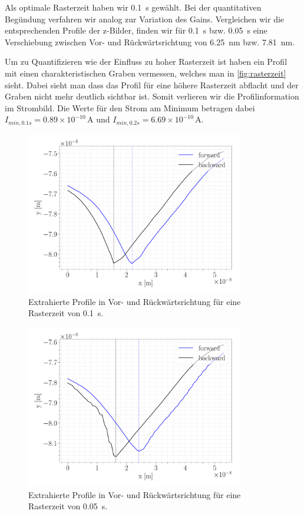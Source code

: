 Als optimale Rasterzeit haben wir \SI{0,1}{s} gewählt. Bei der quantitativen Begündung verfahren wir analog zur Variation des Gains. Vergleichen wir die entsprechenden Profile der z-Bilder, finden wir für \SI{0,1}{s} bzw. \SI{0,05}{s} eine Verschiebung zwischen Vor- und Rückwärtsrichtung von \SI{6,25}{nm} bzw. \SI{7,81}{nm}.

Um zu Quantifizieren wie der Einfluss zu hoher Rasterzeit ist haben ein Profil mit einen charakteristischen Graben vermessen, welches man in \cref{fig:rasterzeit} sieht. Dabei sieht man dass das Profil für eine höhere Rasterzeit abflacht und der Graben nicht mehr deutlich sichtbar ist. Somit verlieren wir die Profilinformation im Strombild. Die Werte für den Strom am Minimum betragen dabei $I_{min,0.1s} = 0.89 \times 10^{-10} \, \mathrm{A}$ und $I_{min,0.2s} = 6.69 \times 10^{-10} \, \mathrm{A}$.

\begin{figure}[H]
\centering
\includegraphics[width=0.85\textwidth]{../Figures/TIME_01_profile.pdf}
\caption{Extrahierte Profile in Vor- und Rückwärtsrichtung für eine Rasterzeit von \SI{0.1}{s}.}
\label{TIME_01_profile}
\end{figure}


\begin{figure}[H]
\centering
\includegraphics[width=0.85\textwidth]{../Figures/TIME_005_profile.pdf}
\caption{Extrahierte Profile in Vor- und Rückwärtsrichtung für eine Rasterzeit von \SI{0.05}{s}.}
\label{TIME_005_profile}
\end{figure}


